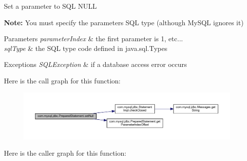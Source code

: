 Set a parameter to S\+QL N\+U\+LL

{\bfseries Note\+:} You must specify the parameters S\+QL type (although My\+S\+QL ignores it) 


\begin{DoxyParams}{Parameters}
{\em parameter\+Index} & the first parameter is 1, etc... \\
\hline
{\em sql\+Type} & the S\+QL type code defined in java.\+sql.\+Types\\
\hline
\end{DoxyParams}

\begin{DoxyExceptions}{Exceptions}
{\em S\+Q\+L\+Exception} & if a database access error occurs \\
\hline
\end{DoxyExceptions}
Here is the call graph for this function\+:
\nopagebreak
\begin{figure}[H]
\begin{center}
\leavevmode
\includegraphics[width=350pt]{classcom_1_1mysql_1_1jdbc_1_1_prepared_statement_ab885f67afaf798c888f537898f82809e_cgraph}
\end{center}
\end{figure}
Here is the caller graph for this function\+:
\nopagebreak
